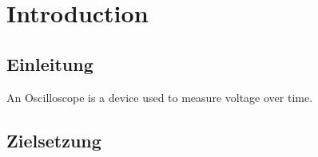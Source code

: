 \section{Introduction}

\subsection{Einleitung}

An Oscilloscope is a device used to measure voltage over time.

\subsection{Zielsetzung}

